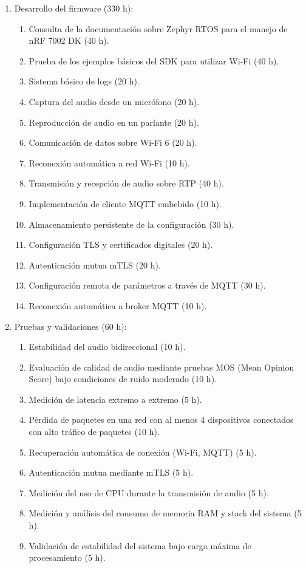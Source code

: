\documentclass[
11pt, %
]{charter}
\begin{document}
\begin{enumerate}
	\item Desarrollo del firmware (330 h):
		\begin{enumerate}
			\item Consulta de la documentación sobre Zephyr RTOS para el manejo de nRF 7002 DK (40 h).
			\item Prueba de los ejemplos básicos del SDK para utilizar Wi-Fi (40 h).
			\item Sistema básico de logs (20 h).
			\item Captura del audio desde un micrófono (20 h).
			\item Reproducción de audio en un parlante (20 h).
			\item Comunicación de datos sobre Wi-Fi 6 (20 h).
			\item Reconexión automática a red Wi-Fi (10 h).
			\item Transmisión y recepción de audio sobre RTP (40 h).
			\item Implementación de cliente MQTT embebido (10 h).
			\item Almacenamiento persistente de la configuración (30 h).
			\item Configuración TLS y certificados digitales (20 h).
			\item Autenticación mutua mTLS (20 h).
			\item Configuración remota de parámetros a través de MQTT (30 h).
			\item Reconexión automática a broker MQTT (10 h).
		\end{enumerate}
	
	\item Pruebas y validaciones (60 h):
		\begin{enumerate}
			\item Estabilidad del audio bidireccional (10 h).
			\item Evaluación de calidad de audio mediante pruebas MOS (Mean Opinion Score) bajo condiciones de ruido moderado (10 h).
			\item Medición de latencia extremo a extremo (5 h).
			\item Pérdida de paquetes en una red con al menos 4 dispositivos conectados con alto tráfico de paquetes (10 h).

			\item Recuperación automática de conexión (Wi-Fi, MQTT) (5 h).
			\item Autenticación mutua mediante mTLS (5 h).
			\item Medición del uso de CPU durante la transmisión de audio (5 h).
			\item Medición y análisis del consumo de memoria RAM y stack del sistema (5 h).
			\item Validación de estabilidad del sistema bajo carga máxima de procesamiento (5 h).
		\end{enumerate}


\end{enumerate}
\end{document}
